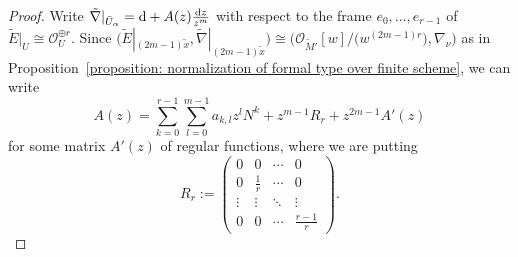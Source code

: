 \documentclass[pdftex]{sigma}
\numberwithin{equation}{section}
\begin{document}
\begin{proof}
Write
$\tilde{\nabla}|_{\bar{U}_{\alpha}}={\rm d}+A(z)\frac{{\rm d}z}{z^m}$
with respect to the frame $e_0,\dots,e_{r-1}$
of $\tilde{E}|_U \cong{\mathcal O}_U^{\oplus r}$.
Since
$\big(\tilde{E}|_{(2m-1)\tilde{x}},\tilde{\nabla}|_{(2m-1)\tilde{x}}\big)\cong
\big({\mathcal O}_{\tilde{M}'}[w]/\big(w^{(2m-1)r}\big),\nabla_{\nu}\big)$
as in Proposition~\ref{proposition: normalization of formal type over finite scheme},
we can write
\begin{equation} \label{equation: normalization of a connection to (2m-1)x}
 A(z)=
 \sum_{k=0}^{r-1}\sum_{l=0}^{m-1} a_{k,l} z^l N^k
 +
 z^{m-1}R_r+z^{2m-1}A'(z)
\end{equation}
for some matrix $A'(z)$ of regular functions,
where we are putting
\begin{equation} \label{equation: definition of R}
 R_r:=
 \begin{pmatrix}
 0 & 0 & \cdots & 0 \\
 0 & \frac{1}{r} & \cdots & 0 \\
 \vdots & \vdots & \ddots & \vdots \\
 0 & 0 & \cdots & \frac{r-1}{r}
 \end{pmatrix}.
\end{equation}



\end{proof}
\end{document}
